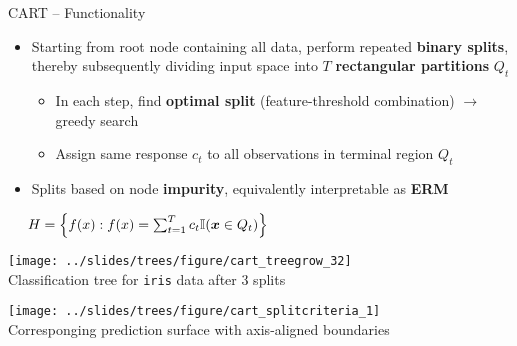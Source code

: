 \begin{frame}{CART -- Functionality}

\footnotesize

  
  

\medskip

\begin{itemize}
  \item Starting from root node containing all data, perform repeated 
  \textbf{binary splits}, thereby subsequently dividing input space into $T$ 
  \textbf{rectangular partitions} $Q_t$
  \begin{itemize}
    \item In each step, find \textbf{optimal split} (feature-threshold 
    combination) $\rightarrow$ greedy search
    \item Assign same response $c_t$ to all observations in terminal region 
    $Q_t$
  \end{itemize}
  \item Splits based on node \textbf{impurity}, equivalently interpretable as 
  \textbf{ERM}
\end{itemize}

\medskip
 
 ~~
$H = \left\{ f(x): f(x) = \sum_{t = 1}^T c_t \mathbb{I}(\bm{x} \in Q_t) 
\right\}$

\medskip

\begin{minipage}[b]{0.5\textwidth}
  \texttt{[image: ../slides/trees/figure/cart\_treegrow\_32]} \\
  \tiny{Classification tree for \texttt{iris} data after 3 splits}
\end{minipage}
\begin{minipage}[b]{0.49\textwidth}
  \texttt{[image: 
  ../slides/trees/figure/cart\_splitcriteria\_1]} \\
  \tiny{Corresponging prediction surface with axis-aligned boundaries}
\end{minipage}%

\end{frame}


